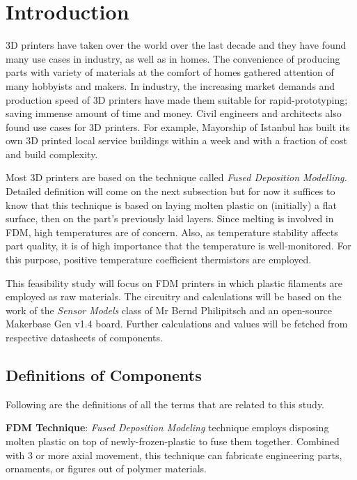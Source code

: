 \section*{Introduction}
\par
3D printers have taken over the world over the last decade and
they have
found many use cases in industry, as well as in homes. The convenience of producing parts with variety of materials at the comfort of homes gathered attention of many hobbyists and makers. In industry, the increasing market demands and production speed of 3D printers have made them suitable for rapid-prototyping; saving immense amount of time and money. Civil engineers and architects also found use cases for 3D printers. For example, Mayorship of Istanbul has built its own
3D printed local service buildings within a week and with a fraction of cost and build complexity.

Most 3D printers are based on the technique called \textit{Fused Deposition Modelling.} Detailed definition will come on the next subsection but for now it suffices to know that this technique is based on laying molten plastic on (initially) a flat surface, then on the part's previously laid layers. Since melting is involved in FDM, high temperatures are of concern. Also, as temperature stability affects part quality, it is of high importance that the temperature is well-monitored. For this purpose, positive temperature coefficient thermistors are employed.

This feasibility study will focus on FDM printers in which plastic filaments are employed as raw materials. The circuitry and calculations will be based on the work of the \textit{Sensor Models} class of Mr Bernd Philipitsch and an open-source Makerbase Gen v1.4 board. Further calculations and values will be fetched from respective datasheets of components.

\subsection{Definitions of Components}

Following are the definitions of all the terms that are related to this study.

\textbf{FDM Technique}: \textit{Fused Deposition Modeling} technique employs disposing molten plastic on top of newly-frozen-plastic to fuse them together. Combined with 3 or more axial movement, this technique can fabricate engineering parts, ornaments, or figures out of polymer materials.

